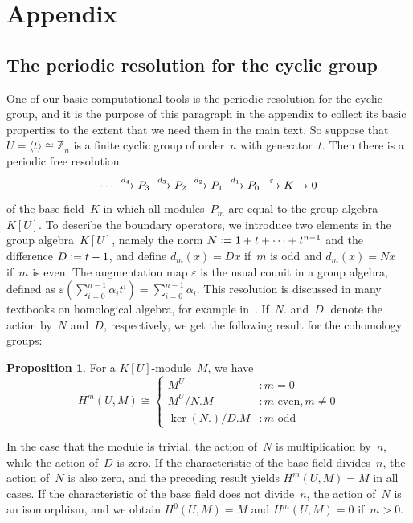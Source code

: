 \documentclass[12pt]{article}
\theoremstyle{definition}
\newtheorem{Proposition}[Satz]{Proposition}
\theoremstyle{break}
\newcommand{\Z}{\mathbb{Z}}
\renewcommand{\1}{\mathbbm{1}}
\newcommand{\deq}{\vcentcolon =}
\begin{document}
\newpage

\appendix
\section{Appendix} \label{Sec:App}
\subsection{The periodic resolution for the cyclic group} \label{PerResCycl}
One of our basic computational tools is the periodic resolution for the cyclic group, and it is the purpose of this paragraph in the appendix to collect its basic properties to the extent that we need them in the main text. So suppose that~$U = \langle t \rangle \cong \Z_n$ is a finite cyclic group of order~$n$ with generator~$t$. Then there is a periodic free resolution
\[\cdots \xlongrightarrow{d_4} P_3 \xlongrightarrow{d_3} P_2 \xlongrightarrow{d_2} P_1 \xlongrightarrow{d_1} P_0 \xlongrightarrow{\varepsilon} K \to 0\]
of the base field~$K$ in which all modules~$P_m$ are equal to the group algebra~$K[U]$. To describe the boundary operators, we introduce two elements in the group algebra~$K[U]$, namely the norm
$N \deq 1 + t + \dots + t^{n-1}$ and the difference $D \deq t-1$, and define
$d_m(x) = Dx$ if~$m$ is odd and $d_m(x) = Nx$  if~$m$ is even. The augmentation map $\varepsilon$ is the usual counit in a group algebra, defined as
$\varepsilon(\sum_{i=0}^{n-1} \alpha_i t^i) = \sum_{i=0}^{n-1}\alpha_i$. This resolution is discussed in many textbooks on homological algebra, for example in~\cite[Chap.~IV, \S~7, p.~121f]{ML1}. If~$N.$ and~$D.$ denote the action by~$N$ and~$D$, respectively, we get the following result for the cohomology groups:
\begin{Proposition} \label{CohomCycl}
For a $K[U]$-module~$M$, we have
\[H^m(U,M) \cong
\begin{cases}
M^{U} &:  m = 0\\
M^{U}/N.M &: m \text{ even}, m \neq 0\\
\ker(N.)/D.M &: m \text{ odd}
\end{cases}\]
\end{Proposition}
In the case that the module is trivial, the action of~$N$ is multiplication by~$n$, while the action of~$D$ is zero. If the characteristic of the base field divides~$n$, the action of~$N$ is also zero, and the preceding result yields $H^m(U,M) = M$ in all cases. If the characteristic of the base field does not divide~$n$, the action of~$N$ is an isomorphism, and we obtain $H^0(U,M) = M$ and $H^m(U,M) = 0$ if~$m>0$.
\end{document}
